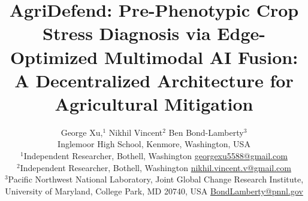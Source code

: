\documentclass[10pt,twocolumn]{article}
\begin{document}
\title{AgriDefend: Pre-Phenotypic Crop Stress Diagnosis via Edge-Optimized Multimodal AI Fusion: A Decentralized Architecture for Agricultural Mitigation}

\author{%
  George Xu,$^{1}$ \quad Nikhil Vincent$^{2}$ \quad Ben Bond-Lamberty$^{3}$\\[3pt]
  \small Inglemoor High School, Kenmore, Washington, USA\\[1pt]
  \small $^{1}$Independent Researcher, Bothell, Washington \quad \href{mailto:georgexu5588@gmail.com}{georgexu5588@gmail.com}\\[1pt]
  \small $^{2}$Independent Researcher, Bothell, Washington \quad \href{mailto:nikhil.vincent.v@gmail.com}{nikhil.vincent.v@gmail.com}\\[1pt]
  \small $^{3}$Pacific Northwest National Laboratory, Joint Global Change Research Institute, University of Maryland, College Park, MD 20740, USA \quad \href{mailto:BondLamberty@pnnl.gov}{BondLamberty@pnnl.gov}\\[1pt]
}
\end{document}
